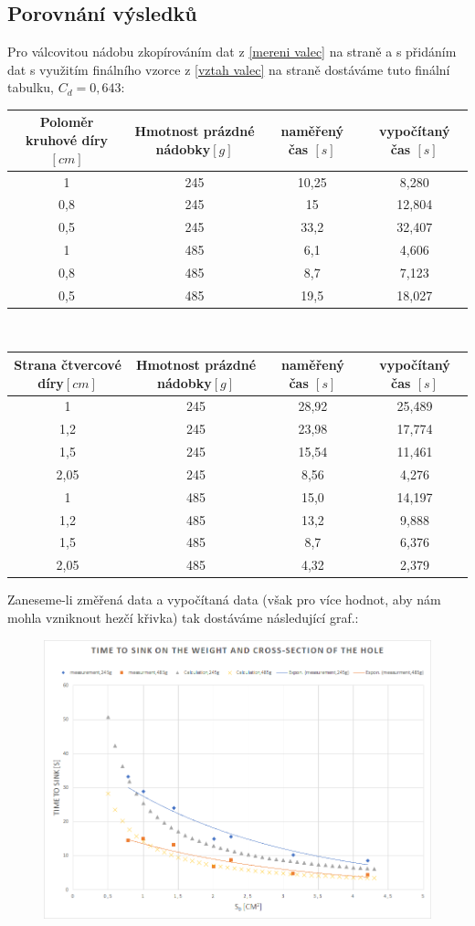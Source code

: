 \documentclass[14pt,a4paper]{article}
\begin{document}
\subsection{Porovnání výsledků}
Pro válcovitou nádobu zkopírováním dat z \ref{mereni valec} na straně \pageref{mereni valec} a s přidáním dat s využitím finálního vzorce z \ref{vztah valec} na straně \pageref{vztah valec} dostáváme tuto finální tabulku, $C_d=0,643$:\\
\begin{tabular}{|c|c||c|c||}
\hline 
Poloměr kruhové díry$[cm]$&Hmotnost prázdné nádobky$[g]$&naměřený čas $[s]$&vypočítaný čas $[s]$\\ 
\hline 
\hline 
1 & 245 & 10,25 & 8,280\\ 
\hline 
0,8 & 245 & 15& 12,804\\ 
\hline 
0,5 & 245 & 33,2& 32,407\\ 
\hline 
1 & 485 & 6,1& 4,606\\ 
\hline 
0,8 & 485 & 8,7& 7,123\\ 
\hline 
0,5 & 485 & 19,5& 18,027\\ 
\hline 
\end{tabular}
\\
\begin{tabular}{|c|c||c|c||}
\hline 
Strana čtvercové díry$[cm]$&Hmotnost prázdné nádobky$[g]$&naměřený čas $[s]$&vypočítaný čas $[s]$\\ 
\hline 
\hline 
1 & 245 & 28,92& 25,489\\ 
\hline 
1,2 & 245 & 23,98& 17,774\\ 
\hline 
1,5 & 245 & 15,54& 11,461\\ 
\hline 
2,05 & 245 & 8,56& 4,276\\ 
\hline 
1 & 485 & 15,0& 14,197\\ 
\hline 
1,2 & 485 & 13,2& 9,888\\ 
\hline 
1,5 & 485 & 8,7& 6,376\\ 
\hline 
2,05 & 485 & 4,32& 2,379\\ 
\hline 
\end{tabular}
Zaneseme-li změřená data a vypočítaná data (však pro více hodnot, aby nám mohla vzniknout hezčí křivka) tak dostáváme následující graf.:
\begin{figure}[H]
\centering
\includegraphics[scale=0.6]{Tabulka2.png}
\label{nakres}
\end{figure}
\end{document}
